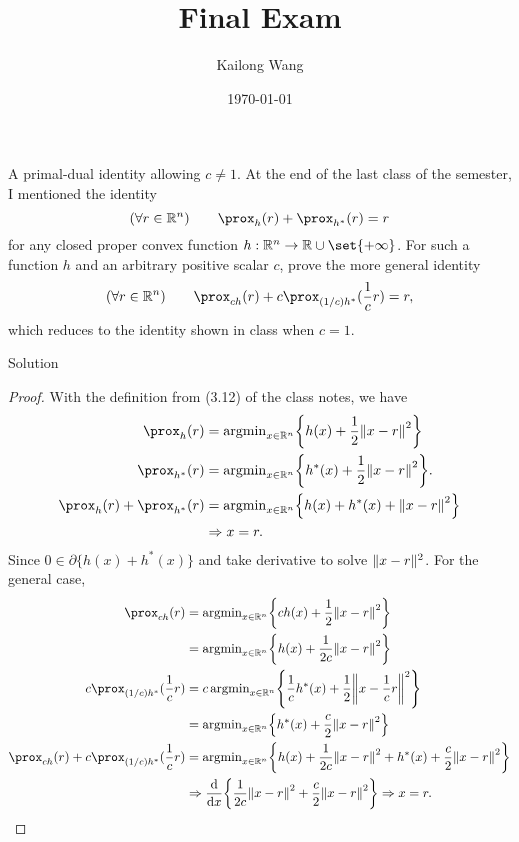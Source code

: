\documentclass{article}
\title{Final Exam}
\author{Kailong Wang}
\date{\today}
\begin{document}
\maketitle

\begin{problem}
    {A primal-dual identity allowing $c\neq 1$.}
    At the end of the last class of the semester, I mentioned the identity
    \[(\forall r\in\R^n) \qquad \prox_h(r)+\prox_{h^*}(r)=r\]
    for any closed proper convex function $h: \R^n\rightarrow\R\cup\set{+\infty}$. For such a function $h$ and an arbitrary positive scalar $c$, prove the more general identity
    \[(\forall r\in\R^n) \qquad \prox_{ch}(r)+c\prox_{(1/c)h^*}(\frac{1}{c}r)=r,\]
    which reduces to the identity shown in class when $c=1$.
\end{problem}

\begin{solution}
    {Solution}
    \begin{proof}
        With the definition from (3.12) of the class notes, we have
        \begin{align*}
            \prox_{h}(r)&=\argmin_{x\in\R^n}\braces*{h(x)+\frac{1}{2}\norm*{x-r}^2} \\
            \prox_{h^*}(r)&=\argmin_{x\in\R^n}\braces*{h^*(x)+\frac{1}{2}\norm*{x-r}^2}. \\
            \prox_{h}(r)+\prox_{h^*}(r)&=\argmin_{x\in\R^n}\braces*{h(x)+h^*(x)+\norm*{x-r}^2} \\
            &\Rightarrow x=r.
        \end{align*}
        Since $0\in \partial\{h(x)+h^*(x)\}$ and take derivative to solve $\lVert x-r\rVert^2$. For the general case,
        \begin{align*}
            \prox_{ch}(r)
            &= \argmin_{x\in\R^n}\braces*{ch(x)+\frac{1}{2}\norm*{x-r}^2} \\
            &= \argmin_{x\in\R^n}\braces*{h(x)+\frac{1}{2c}\norm*{x-r}^2} \\
            c \prox_{(1/c)h^*}(\frac{1}{c}r)
            &= c \argmin_{x\in\R^n}\braces*{\frac{1}{c}h^*(x)+\frac{1}{2}\norm*{x-\frac{1}{c}r}^2} \\
            &= \argmin_{x\in\R^n}\braces*{h^*(x)+\frac{c}{2}\norm*{x-r}^2} \\
            \prox_{ch}(r)+c \prox_{(1/c)h^*}(\frac{1}{c}r)
            &= \argmin_{x\in\R^n}\braces*{h(x)+\frac{1}{2c}\norm*{x-r}^2+h^*(x)+\frac{c}{2}\norm*{x-r}^2} \\
            &\Rightarrow \frac{\diff}{\diff x}\braces*{\frac{1}{2c}\norm*{x-r}^2+\frac{c}{2}\norm*{x-r}^2} \Rightarrow x=r.
        \end{align*}
    \end{proof}
\end{solution}
\end{document}

